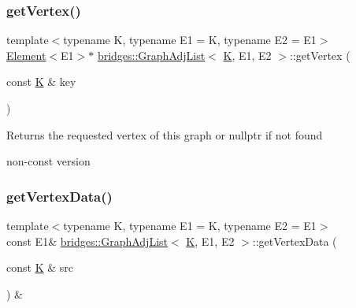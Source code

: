 \subsubsection{\texorpdfstring{getVertex()}{getVertex()}\hspace{0.1cm}{\footnotesize\ttfamily [2/2]}}
{\footnotesize\ttfamily template$<$typename K, typename E1 = K, typename E2 = E1$>$ \\
\mbox{\hyperlink{classbridges_1_1_element}{Element}}$<$E1$>$$\ast$ \mbox{\hyperlink{classbridges_1_1_graph_adj_list}{bridges\+::\+Graph\+Adj\+List}}$<$ \mbox{\hyperlink{namespacebridges_acfb0a4f7877d8f63de3e6862004c50edaa5f3c6a11b03839d46af9fb43c97c188}{K}}, E1, E2 $>$\+::get\+Vertex (\begin{DoxyParamCaption}\item[{const \mbox{\hyperlink{namespacebridges_acfb0a4f7877d8f63de3e6862004c50edaa5f3c6a11b03839d46af9fb43c97c188}{K}} \&}]{key }\end{DoxyParamCaption})\hspace{0.3cm}{\ttfamily [inline]}}

\begin{DoxyReturn}{Returns}
the requested vertex of this graph or nullptr if not found
\end{DoxyReturn}
non-\/const version \mbox{\label{classbridges_1_1_graph_adj_list_a38ab30a0990187275d32e0590e150aaf}} 
\subsubsection{\texorpdfstring{getVertexData()}{getVertexData()}}
{\footnotesize\ttfamily template$<$typename K, typename E1 = K, typename E2 = E1$>$ \\
const E1\& \mbox{\hyperlink{classbridges_1_1_graph_adj_list}{bridges\+::\+Graph\+Adj\+List}}$<$ \mbox{\hyperlink{namespacebridges_acfb0a4f7877d8f63de3e6862004c50edaa5f3c6a11b03839d46af9fb43c97c188}{K}}, E1, E2 $>$\+::get\+Vertex\+Data (\begin{DoxyParamCaption}\item[{const \mbox{\hyperlink{namespacebridges_acfb0a4f7877d8f63de3e6862004c50edaa5f3c6a11b03839d46af9fb43c97c188}{K}} \&}]{src }\end{DoxyParamCaption}) \&\hspace{0.3cm}{\ttfamily [inline]}}

